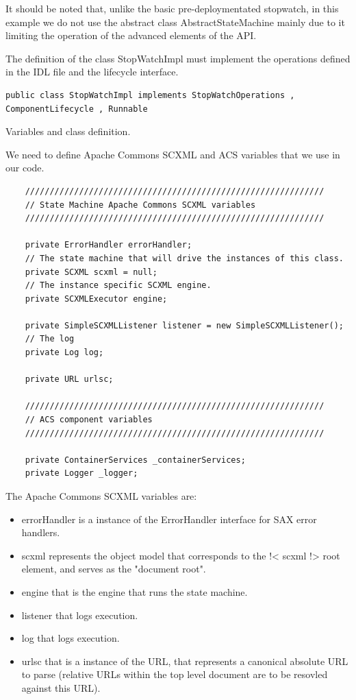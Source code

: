 \documentclass[]{article}
\begin{document}
It should be noted that, unlike the basic pre-deploymentated stopwatch, in this example we do not use the abstract class \textsf{AbstractStateMachine} mainly due to it limiting the operation of the advanced elements of the API. 

The definition of the class \textsf{StopWatchImpl} must implement the operations defined in the IDL file and the lifecycle interface. 

\begin{lstlisting}
public class StopWatchImpl implements StopWatchOperations , ComponentLifecycle , Runnable
\end{lstlisting}

Variables and class definition.

We need to define Apache Commons SCXML and ACS variables that we use in our code. 
	
\begin{lstlisting}
    /////////////////////////////////////////////////////////////
    // State Machine Apache Commons SCXML variables
    /////////////////////////////////////////////////////////////

    private ErrorHandler errorHandler;
    // The state machine that will drive the instances of this class.
    private SCXML scxml = null;
    // The instance specific SCXML engine.
    private SCXMLExecutor engine;

    private SimpleSCXMLListener listener = new SimpleSCXMLListener();
    // The log
    private Log log;
  
    private URL urlsc;

    /////////////////////////////////////////////////////////////
    // ACS component variables
    /////////////////////////////////////////////////////////////

    private ContainerServices _containerServices;
    private Logger _logger;

\end{lstlisting}

The Apache Commons SCXML variables are:
\begin{itemize}
    \item \textsf{errorHandler} is a instance of the ErrorHandler interface for SAX error handlers.
    \item \textsf{scxml} represents the object model that corresponds to the !< scxml !> root element, and serves as the "document root".
    \item \textsf{engine} that is the engine that runs the state machine.
    \item \textsf{listener} that logs execution.
    \item \textsf{log} that logs execution.
    \item \textsf{urlsc} that is a instance of the URL, that represents a canonical absolute URL to parse (relative URLs within the top level document are to be resovled against this URL). 
\end{itemize}
\end{document}
